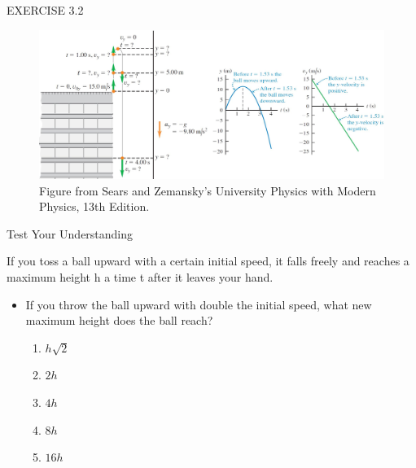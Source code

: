 \documentclass[]{beamer}
\begin{document}
\begin{frame}
    EXERCISE 3.2
  
    \begin{center}

        \begin{figure}[h!]  
            \includegraphics[width=1.1\textwidth]{images/3.jpg}
             \caption {{\tiny Figure from Sears and Zemansky's University Physics 
             with Modern Physics, 13th Edition.} }
          \end{figure}
        
    \end{center}

      
    
    \end{frame}








\begin{frame}
    Test Your Understanding
    \vspace{3mm}
    \pause

If you toss a ball upward with a certain initial speed, it falls freely and reaches a maximum 
height h a time t after it leaves your hand.
\vspace{3mm}

\pause
\begin{itemize}
    \item If you throw the ball upward with double the initial speed,
    what new maximum height does the ball reach?
    \pause
        \begin{enumerate}
            \item $h\sqrt{2}$
            \item $2h$
            \item $4h$
            \item $8h$
            \item $16h$
        \end{enumerate}

\end{itemize}

    
    \end{frame}
\end{document}
